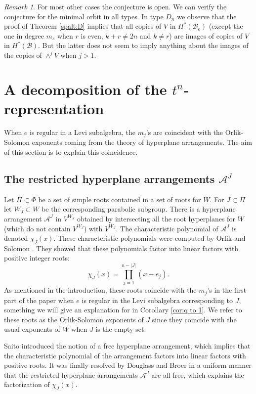 \documentclass[10pt]{amsart}
\newcommand{\ro}{{\Phi}}
\newcommand{\flag}{{\mathcal B}}
\theoremstyle{plain}
\theoremstyle{definition}
\theoremstyle{remark}
\newtheorem{remark}[theorem]{Remark}
\begin{document}
\begin{remark}
For most other cases the conjecture is open.
We can verify the conjecture for the minimal orbit in all types.
In type $D_n$ we observe that the proof of Theorem \ref{spalt:D} implies that
all copies of $V$ in $H^*(\flag_e)$ (except the one in degree $m_s$ when $r$ is even, $k+r \neq 2n$ and $k \neq r$)
are images of copies of $V$ in $H^*(\flag)$.  But the latter does not seem to imply anything about 
the images of the copies of  $\wedge^j V$ when $j >1$.
\end{remark}

\section{\texorpdfstring{A decomposition of the $t^n$-representation}{A decomposition of the tn-representation}}

When $e$ is regular in a Levi subalgebra, 
the $m_j$'s are coincident with the Orlik-Solomon exponents coming from the theory of hyperplane arrangements.  The aim of this section is to explain this coincidence.

\subsection{The restricted hyperplane arrangements $\mathcal{A}^J$}

Let $\Pi \subset \ro$ be a set of simple roots contained in a set of roots for $W$.  
For $J \subset \Pi$ let $W_J \subset W$ be the corresponding parabolic subgroup.
There is a hyperplane arrangement $\mathcal{A}^J$ in $V^{W_J}$ obtained by intersecting all the root hyperplanes for $W$ (which do not contain $V^{W_J}$) with $V^{W_J}$.  The characteristic polynomial of $\mathcal{A}^J$ is denoted $\chi_J(x)$. These characteristic polynomials were computed by Orlik and Solomon \cite{os:exponents}.    They showed that these polynomials factor into linear factors with positive integer roots:
$$\chi_J(x) = \prod_{j=1}^{n  - |J|} (x - e_j).$$
As mentioned in the introduction, these roots coincide with the $m_j$'s in the first part of the paper when $e$ is regular in the Levi subalgebra corresponding to $J$,
something we will give an explanation for in Corollary \ref{cor:q to 1}.  
We refer to these roots as the Orlik-Solomon exponents of $J$ since they coincide with the usual exponents of $W$ when $J$ is the empty set.  

Saito \cite{saito} introduced the notion of a free hyperplane arrangement, which implies that the characteristic polynomial of the arrangement factors into linear factors with positive roots.   It was finally resolved by Douglass \cite{douglass} and Broer \cite{broer:decomp} in a uniform manner that the restricted hyperplane arrangements $\mathcal{A}^J$ are all free, which explains the factorization of $\chi_J(x)$. 
\end{document}
